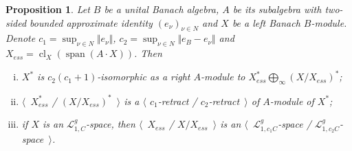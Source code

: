 \documentclass[12pt]{article}
\newtheorem{proposition}[theorem]{Proposition}
\begin{document}
\begin{proposition}\label{DualBanModDecomp} Let $B$ be a unital Banach algebra, $A$ be its subalgebra with two-sided bounded approximate identity $(e_\nu)_{\nu\in N}$ and $X$ be a left Banach $B$-module. Denote $c_1=\sup_{\nu\in N}\Vert e_\nu\Vert$, $c_2=\sup_{\nu\in N}\Vert e_B-e_\nu\Vert$ and $X_{ess}=\operatorname{cl}_X(\operatorname{span}(A\cdot X))$. Then
\begin{enumerate}[i)]
\item $X^*$ is $c_2(c_1+1)$-isomorphic as a right $A$-module to $X_{ess}^*\bigoplus_\infty (X/X_{ess})^*$;
\item $\langle$~$X_{ess}^*$ / $(X/X_{ess})^*$~$\rangle$ is a $\langle$ $c_1$-retract / $c_2$-retract~$\rangle$ of $A$-module of $X^*$;
\item if $X$ is an $\mathcal{L}_{1,C}^g$-space, then $\langle$~$X_{ess}$ / $X/X_{ess}$~$\rangle$ is an $\langle$~$\mathcal{L}_{1,c_1C}^g$-space / $\mathcal{L}_{1,c_2C}^g$-space~$\rangle$.
\end{enumerate}
\end{proposition}
\end{document}
